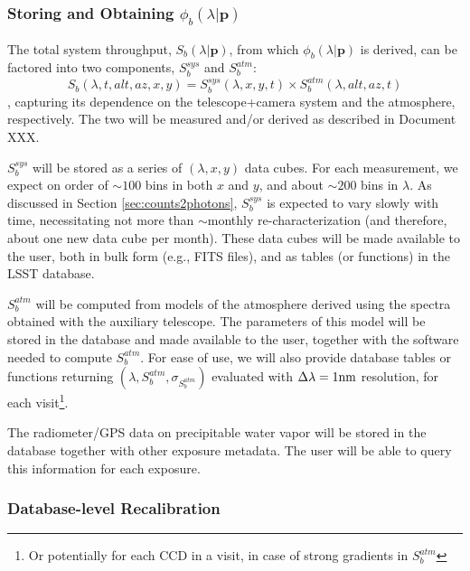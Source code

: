 \documentclass[12pt,preprint]{aastex}
\begin{document}
\subsubsection{Storing and Obtaining $\phi_b(\lambda|\mathbf{p})$}

The total system throughput, $S_b(\lambda | \mathbf{p})$, from which $\phi_b(\lambda | \mathbf{p})$ is derived, can be factored into two components, $S_b^{sys}$ and $S_b^{atm}$:
%
\begin{equation}
    S_b(\lambda, t, alt, az, x, y) = S_b^{sys}(\lambda, x, y, t) \times S_b^{atm}(\lambda, alt, az, t)
\end{equation}
%
, capturing its dependence on the telescope+camera system and the atmosphere, respectively. The two will be measured and/or derived as described in Document XXX.

$S_b^{sys}$ will be stored as a series of $(\lambda, x, y)$ data cubes. For each measurement, we expect on order of $\sim 100$ bins in both $x$ and $y$, and about $\sim 200$ bins in $\lambda$. As discussed in Section \ref{sec:counts2photons}, $S_b^{sys}$ is expected to vary slowly with time, necessitating not more than $\sim$monthly re-characterization (and therefore, about one new data cube per month). These data cubes will be made available to the user, both in bulk form (e.g., FITS files), and as tables (or functions) in the LSST database.

$S_b^{atm}$ will be computed from models of the atmosphere derived using the spectra obtained with the auxiliary telescope. The parameters of this model will be stored in the database and made available to the user, together with the software needed to compute $S_b^{atm}$. For ease of use, we will also provide database tables or functions returning $(\lambda, S_b^{atm}, \sigma_{S_b^{atm}})$ evaluated with $\Delta\lambda = 1 {\rm nm}$ resolution, for each visit\footnote{Or potentially for each CCD in a visit, in case of strong gradients in $S_b^{atm}$}.

The radiometer/GPS data on precipitable water vapor will be stored in the database together with other exposure metadata. The user will be able to query this information for each exposure.

\subsubsection{Database-level Recalibration}
\end{document}
